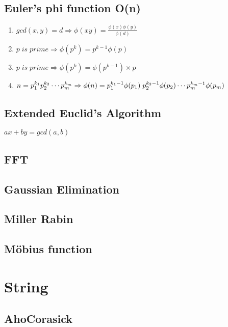 \documentclass[11pt,twocolumn,a4paper]{article}
\begin{document}
\subsection{Euler's phi function O(n)}
\begin{enumerate}[1.]
\item $gcd(x,y)=d \Rightarrow \phi(xy) = \frac{\phi(x) \phi(y)}{\phi(d)}$
\item $p\; is\; prime \Rightarrow \phi(p^k) = p^{k-1} \phi(p)$
\item $p\; is\; prime \Rightarrow \phi(p^k) = \phi(p^{k-1}) \times p$
\item $n = p_{1}^{k_1} p_{2}^{k_2} \cdots p_{m}^{k_m}\\
\Rightarrow \phi(n) = p_{1}^{k_1-1}\phi(p_1)\; p_{2}^{k_2-1}\phi(p_2) \cdots p_{m}^{k_m-1}\phi(p_m)$
\end{enumerate}


\subsection{Extended Euclid's Algorithm}
$ ax+by=gcd(a,b) $


\subsection{FFT}


\subsection{Gaussian Elimination}


\subsection{Miller Rabin}


\subsection{Möbius function}



\newpage
\section{String}
\subsection{AhoCorasick}

\end{document}
